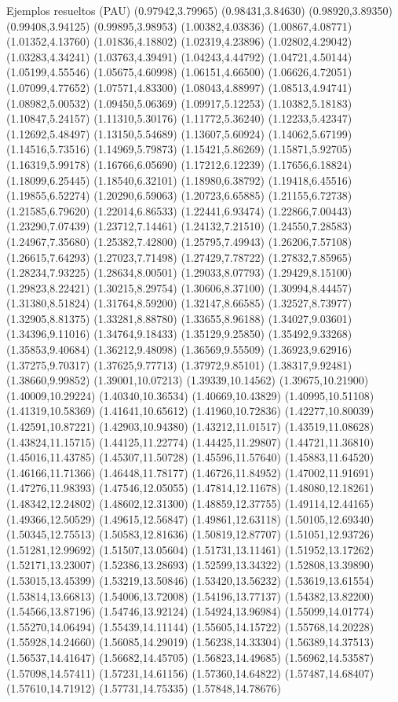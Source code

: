 \documentclass[11pt,a4paper]{article}
\begin{document}
\begin{fmex}{Ejemplos resueltos (PAU)}
(0.97942,3.79965) (0.98431,3.84630) (0.98920,3.89350) (0.99408,3.94125) (0.99895,3.98953) (1.00382,4.03836) (1.00867,4.08771) (1.01352,4.13760) (1.01836,4.18802) (1.02319,4.23896) (1.02802,4.29042) (1.03283,4.34241) (1.03763,4.39491) (1.04243,4.44792) (1.04721,4.50144) (1.05199,4.55546) (1.05675,4.60998) (1.06151,4.66500) (1.06626,4.72051) (1.07099,4.77652) (1.07571,4.83300) (1.08043,4.88997) (1.08513,4.94741) (1.08982,5.00532) (1.09450,5.06369) (1.09917,5.12253) (1.10382,5.18183) (1.10847,5.24157) (1.11310,5.30176) (1.11772,5.36240) (1.12233,5.42347) (1.12692,5.48497) (1.13150,5.54689) (1.13607,5.60924) (1.14062,5.67199) (1.14516,5.73516) (1.14969,5.79873) (1.15421,5.86269) (1.15871,5.92705) (1.16319,5.99178) (1.16766,6.05690) (1.17212,6.12239) (1.17656,6.18824) (1.18099,6.25445) (1.18540,6.32101) (1.18980,6.38792) (1.19418,6.45516) (1.19855,6.52274) (1.20290,6.59063) (1.20723,6.65885) (1.21155,6.72738) (1.21585,6.79620) (1.22014,6.86533) (1.22441,6.93474) (1.22866,7.00443) (1.23290,7.07439) (1.23712,7.14461) (1.24132,7.21510) (1.24550,7.28583) (1.24967,7.35680) (1.25382,7.42800) (1.25795,7.49943) (1.26206,7.57108) (1.26615,7.64293) (1.27023,7.71498) (1.27429,7.78722) (1.27832,7.85965) (1.28234,7.93225) (1.28634,8.00501) (1.29033,8.07793) (1.29429,8.15100) (1.29823,8.22421) (1.30215,8.29754) (1.30606,8.37100) (1.30994,8.44457) (1.31380,8.51824) (1.31764,8.59200) (1.32147,8.66585) (1.32527,8.73977) (1.32905,8.81375) (1.33281,8.88780) (1.33655,8.96188) (1.34027,9.03601) (1.34396,9.11016) (1.34764,9.18433) (1.35129,9.25850) (1.35492,9.33268) (1.35853,9.40684) (1.36212,9.48098) (1.36569,9.55509) (1.36923,9.62916) (1.37275,9.70317) (1.37625,9.77713) (1.37972,9.85101) (1.38317,9.92481) (1.38660,9.99852) (1.39001,10.07213) (1.39339,10.14562) (1.39675,10.21900) (1.40009,10.29224) (1.40340,10.36534) (1.40669,10.43829) (1.40995,10.51108) (1.41319,10.58369) (1.41641,10.65612) (1.41960,10.72836) (1.42277,10.80039) (1.42591,10.87221) (1.42903,10.94380) (1.43212,11.01517) (1.43519,11.08628) (1.43824,11.15715) (1.44125,11.22774) (1.44425,11.29807) (1.44721,11.36810) (1.45016,11.43785) (1.45307,11.50728) (1.45596,11.57640) (1.45883,11.64520) (1.46166,11.71366) (1.46448,11.78177) (1.46726,11.84952) (1.47002,11.91691) (1.47276,11.98393) (1.47546,12.05055) (1.47814,12.11678) (1.48080,12.18261) (1.48342,12.24802) (1.48602,12.31300) (1.48859,12.37755) (1.49114,12.44165) (1.49366,12.50529) (1.49615,12.56847) (1.49861,12.63118) (1.50105,12.69340) (1.50345,12.75513) (1.50583,12.81636) (1.50819,12.87707) (1.51051,12.93726) (1.51281,12.99692) (1.51507,13.05604) (1.51731,13.11461) (1.51952,13.17262) (1.52171,13.23007) (1.52386,13.28693) (1.52599,13.34322) (1.52808,13.39890) (1.53015,13.45399) (1.53219,13.50846) (1.53420,13.56232) (1.53619,13.61554) (1.53814,13.66813) (1.54006,13.72008) (1.54196,13.77137) (1.54382,13.82200) (1.54566,13.87196) (1.54746,13.92124) (1.54924,13.96984) (1.55099,14.01774) (1.55270,14.06494) (1.55439,14.11144) (1.55605,14.15722) (1.55768,14.20228) (1.55928,14.24660) (1.56085,14.29019) (1.56238,14.33304) (1.56389,14.37513) (1.56537,14.41647) (1.56682,14.45705) (1.56823,14.49685) (1.56962,14.53587) (1.57098,14.57411) (1.57231,14.61156) (1.57360,14.64822) (1.57487,14.68407) (1.57610,14.71912) (1.57731,14.75335) (1.57848,14.78676) 
\end{fmex}
\end{document}
